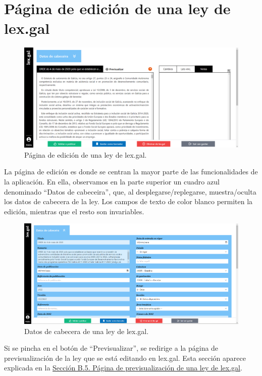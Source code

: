 \section{Página de edición de una ley de lex.gal}
\label{PEdicionLexGal}

\begin{figure}[H]
\centerline{\includegraphics[width=15cm]{figuras/manualUsuario/EditarPrincipal.PNG}}
\caption{Página de edición de una ley de lex.gal.}
\label{enlaceEdicionLexGal}
\end{figure}

La página de edición es donde se centran la mayor parte de las funcionalidades de la aplicación. En ella, observamos en la parte superior un cuadro azul denominado ``Datos de cabeceira'', que, al desplegarse/replegarse, muestra/oculta los datos de cabecera de la ley. Los campos de texto de color blanco permiten la edición, mientras que el resto son invariables.

\begin{figure}[H]
\centerline{\includegraphics[width=15cm]{figuras/manualUsuario/EditarCabecera.PNG}}
\caption{Datos de cabecera de una ley de lex.gal.}
\label{enlaceCabeceraLexGal}
\end{figure}

Si se pincha en el botón de ``Previsualizar'', se redirige a la página de previsualización de la ley que se está editando en lex.gal. Esta sección aparece explicada en la \hyperref[PPrevisualizacionLexGal]{Sección B.5. Página de previsualización de una ley de lex.gal}.

